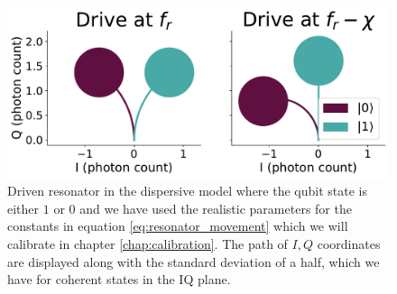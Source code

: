 \begin{figure}
    \centering
    \includegraphics{Simulations/readout_simulations/IQ_movement_without_kappa.pdf}
    \caption{Driven resonator in the dispersive model where the qubit state is either $1$ or $0$ and we have used the realistic parameters for the constants in equation \ref{eq:resonator_movement} which we will calibrate in chapter \ref{chap:calibration}. The path of $I, Q$ coordinates are displayed along with the standard deviation of a half, which we have for coherent states in the IQ plane.}
    \label{fig:IQ_movement_without_kappa}
\end{figure}




